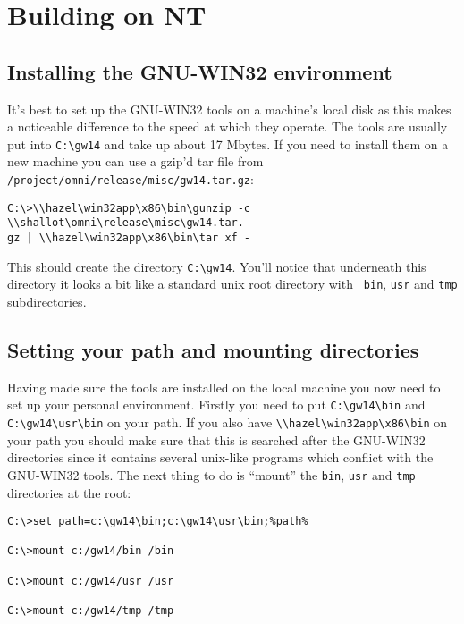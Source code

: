 \documentclass[11pt,twoside,onecolumn]{article}
\begin{document}
\section{Building on NT}

\subsection{Installing the GNU-WIN32 environment}

It's best to set up the GNU-WIN32 tools on a machine's local disk as this makes
a noticeable difference to the speed at which they operate.  The tools are
usually put into \verb|C:\gw14| and take up about 17 Mbytes.  If you need to
install them on a new machine you can use a gzip'd tar file from
\verb|/project/omni/release/misc/gw14.tar.gz|:

{\small \begin{verbatim}
C:\>\\hazel\win32app\x86\bin\gunzip -c \\shallot\omni\release\misc\gw14.tar.
gz | \\hazel\win32app\x86\bin\tar xf -
\end{verbatim}}

This should create the directory \verb|C:\gw14|.  You'll notice that underneath
this directory it looks a bit like a standard unix root directory with {\tt
bin}, {\tt usr} and {\tt tmp} subdirectories.

\subsection{Setting your path and mounting directories}

Having made sure the tools are installed on the local machine you now need to
set up your personal environment.  Firstly you need to put \verb|C:\gw14\bin|
and \verb|C:\gw14\usr\bin| on your path.  If you also have
\verb|\\hazel\win32app\x86\bin| on your path you should make sure that this is
searched after the GNU-WIN32 directories since it contains several unix-like
programs which conflict with the GNU-WIN32 tools.  The next thing to do is
``mount'' the {\tt bin}, {\tt usr} and {\tt tmp} directories at the root:

{\small \begin{verbatim}
C:\>set path=c:\gw14\bin;c:\gw14\usr\bin;%path%

C:\>mount c:/gw14/bin /bin

C:\>mount c:/gw14/usr /usr

C:\>mount c:/gw14/tmp /tmp
\end{verbatim}}
\end{document}
